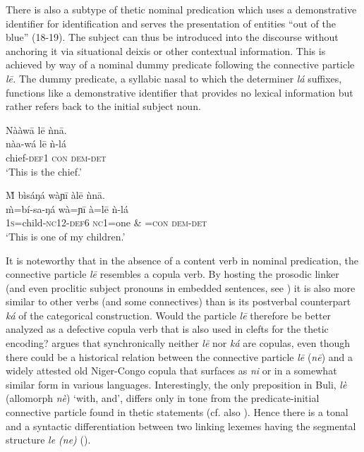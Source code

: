 \documentclass[output=paper]{langsci/langscibook}
\begin{document}
There is also a subtype of thetic nominal predication which uses a demonstrative identifier for identification and serves the presentation of entities “out of the blue” (18-19). The subject can thus be introduced into the discourse without anchoring it via situational deixis or other contextual information. This is achieved by way of a nominal dummy predicate following the connective particle \textit{l\={e}.} The dummy predicate, a syllabic nasal to which the determiner \textit{lá} suffixes, functions like a demonstrative identifier that provides no lexical information but rather refers back to the initial subject noun.

\ea\label{ex:schwarz:18}
\glll   Nààw\={a}    l\={e}  ǹn\={a}.\\
    \textup{nàa-wá}    l\={e}  {ǹ-lá}\\
       chief-\textsc{def1}  \textsc{con}  \textsc{dem}-\textsc{det}\\
\glt ‘This is the chief.’ \citep[88]{Schwarz2007}
\z

\ea\label{ex:schwarz:19}
\glll  \`{M}   bìsáŋá    wàɲ\={i}    àl\={e}    ǹn\={a}.\\
    \textup{\`{m}=bí-sa-ŋá}    wà=ɲ\={i}    à=l\={e}    {ǹ-lá}\\
       1\textsc{s}=child-\textsc{nc}12-\textsc{def}6  \textsc{nc}1=one  \& =\textsc{con}  \textsc{dem-det}\\
\glt ‘This is one of my children.’ \citep[88]{Schwarz2007}
\z

It is noteworthy that in the absence of a content verb in nominal predication, the connective particle \textit{l\={e}} resembles a copula verb. By hosting the prosodic linker (and even proclitic subject pronouns in embedded sentences, see ) it is also more similar to other verbs (and some connectives) than is its postverbal counterpart \textit{ká} of the categorical construction. Would the particle \textit{l\={e}} therefore be better analyzed as a defective copula verb that is also used in clefts for the thetic encoding? \citet{Schwarz2009} argues that synchronically neither \textit{l\={e}} nor \textit{ká} are copulas, even though there could be a historical relation between the connective particle \textit{l\={e}} (\textit{n\={e}}) and a widely attested old Niger-Congo copula that surfaces as \textit{ni} or in a somewhat similar form in various languages. Interestingly, the only preposition in Buli, \textit{lè} (allomorph \textit{nè}) ‘with, and’, differs only in tone from the predicate-initial connective particle found in thetic statements (cf. also \citealt{Schwarz2010a}). Hence there is a tonal and a syntactic differentiation between two linking lexemes having the segmental structure \textit{le (ne)} ().
\end{document}
